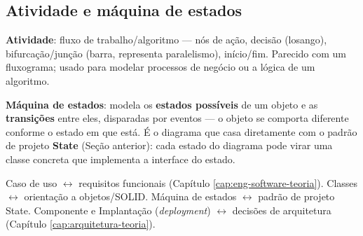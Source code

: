 \subsection{Atividade e máquina de estados}

\begin{conceito}
\textbf{Atividade}: fluxo de trabalho/algoritmo --- nós de ação, decisão
(losango), bifurcação/junção (barra, representa paralelismo), início/fim.
Parecido com um fluxograma; usado para modelar processos de negócio ou a
lógica de um algoritmo.

\textbf{Máquina de estados}: modela os \textbf{estados possíveis} de um
objeto e as \textbf{transições} entre eles, disparadas por eventos --- o
objeto se comporta diferente conforme o estado em que está. É o diagrama
que casa diretamente com o padrão de projeto \textbf{State} (Seção
anterior): cada estado do diagrama pode virar uma classe concreta que
implementa a interface do estado.
\end{conceito}

\begin{regrapratica}
Caso de uso $\leftrightarrow$ requisitos funcionais (Capítulo
\ref{cap:eng-software-teoria}). Classes $\leftrightarrow$ orientação a
objetos/SOLID. Máquina de estados $\leftrightarrow$ padrão de projeto
State. Componente e Implantação (\textit{deployment})
$\leftrightarrow$ decisões de arquitetura (Capítulo
\ref{cap:arquitetura-teoria}).
\end{regrapratica}
